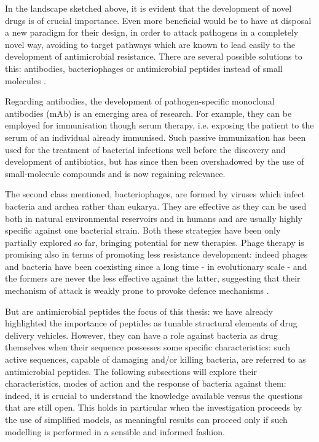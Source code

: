 In the landscape sketched above, it is evident that the development of novel drugs is of crucial importance. Even more beneficial would be to have at disposal a new paradigm for their design, in order to attack pathogens in a completely novel way, avoiding to target pathways which are known to lead easily to the development of antimicrobial resistance. There are several possible solutions to this: antibodies, bacteriophages or antimicrobial peptides instead of small molecules \cite{Mantravadi2019}.

Regarding antibodies, the development of pathogen-specific monoclonal antibodies (mAb) is an emerging area of research. For example, they can be employed for immunisation though serum therapy, i.e. exposing the patient to the serum of an individual already immunised. Such passive immunization has been used for the treatment of bacterial infections well before the discovery and development of antibiotics, but has since then been overshadowed by the use of small-molecule compounds and is now regaining relevance.

The second class mentioned, bacteriophages, are formed by viruses which infect bacteria and archea rather than eukarya. They are effective as they can be used both in natural environmental reservoirs and in humans and are usually highly specific against one bacterial strain.
%
Both these strategies have been only partially explored so far, bringing potential for new therapies. Phage therapy is promising also in terms of promoting less resistance development: indeed phages and bacteria have been coexisting since a long time - in evolutionary scale - and the formers are never the less effective against the latter, suggesting that their mechanism of attack is weakly prone to provoke defence mechanisms \cite{??}.

But are antimicrobial peptides the focus of this thesis: we have already highlighted the importance of peptides as tunable structural elements of drug delivery vehicles. However, they can have a role against bacteria as drug themselves when their sequence possesses some specific characteristics: such active sequences, capable of damaging and/or killing bacteria, are referred to as antimicrobial peptides. The following subsections will explore their characteristics, modes of action and the response of bacteria against them: indeed, it is crucial to understand the knowledge available versus the questions that are still open. This holds in particular when the investigation proceeds by the use of simplified models, as meaningful results can proceed only if such modelling is performed in a sensible and informed fashion.

